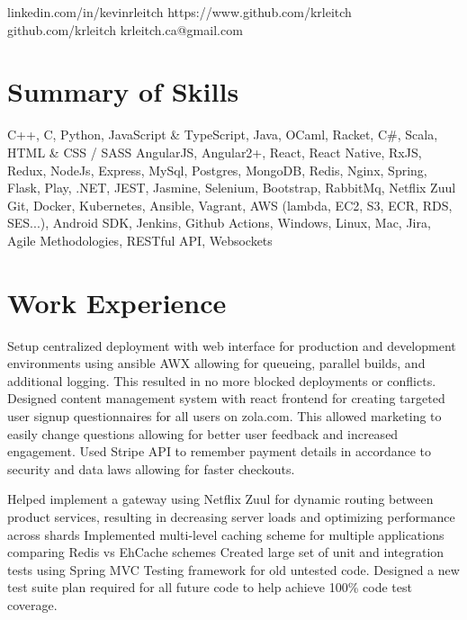 \documentclass{my_resume}
\begin{document}
        {linkedin.com/in/kevinrleitch}
        {https://www.github.com/krleitch}
        {github.com/krleitch}
        {krleitch.ca@gmail.com}

\section{Summary of Skills}
{C++, C, Python, JavaScript \& TypeScript, Java, OCaml, Racket, C\#, Scala, HTML \& CSS / SASS}
{AngularJS, Angular2+, React, React Native, RxJS, Redux, NodeJs, Express, MySql, Postgres,
 MongoDB, Redis, Nginx, Spring, Flask, Play, .NET, JEST, Jasmine, Selenium, Bootstrap, RabbitMq, Netflix Zuul}
{Git, Docker, Kubernetes, Ansible, Vagrant, AWS (lambda, EC2, S3, ECR, RDS, SES...),
 Android SDK, Jenkins, Github Actions, Windows, Linux, Mac, Jira, Agile Methodologies, RESTful API, Websockets}

\section{Work Experience}

\workitemsthree
{Setup centralized deployment with web interface for production and development environments using ansible AWX allowing for queueing,
 parallel builds, and additional logging. This resulted in no more blocked deployments or conflicts.}
{Designed content management system with react frontend for creating targeted user signup questionnaires for all users on zola.com. This allowed marketing
 to easily change questions allowing for better user feedback and increased engagement.}
{Used Stripe API to remember payment details in accordance to security and data laws allowing for faster checkouts.}

\workitemsthree
{Helped implement a gateway using Netflix Zuul for dynamic routing between product services,
 resulting in decreasing server loads and optimizing performance across shards}
{Implemented multi-level caching scheme for multiple applications comparing Redis vs EhCache schemes}
{Created large set of unit and integration tests using Spring MVC Testing framework for old untested code.
 Designed a new test suite plan required for all future code to help achieve 100\% code test coverage.}
\end{document}
